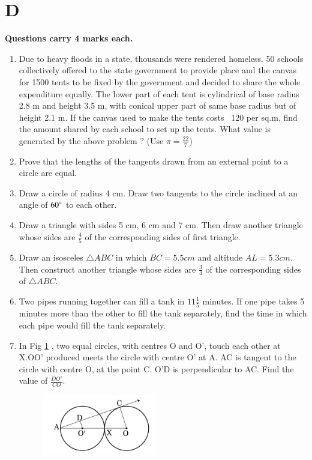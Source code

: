 \documentclass[book,11pt,onecolumn]{IEEEtran}
\renewcommand\thesection{\arabic{section}}
\begin{document}
\section{\textbf{D}}  
\textbf{Questions carry 4 marks each.} \\
\begin{enumerate}[label=\thesection.\arabic*.,ref=\thesection.\theenumi]
\item  Due to heavy floods in a state, thousands were rendered homeless. 50 schools collectively offered to the state government to provide place and the canvas for 1500 tents to be fixed by the government and decided to share the whole expenditure equally. The lower part of each tent is cylindrical of base radius 2.8 m and height 3.5 m, with conical upper part of same base radius but of height 2.1 m. If the canvas used to make the tents costs \rupee~120 per sq.m, find the amount shared by each school to set up the tents. What value is generated by the above problem ? (Use $ \pi = \frac{22}{7} ) $\\
 
\item Prove that the lengths of the tangents drawn from an external point to a circle are equal.\\
\item Draw a circle of radius 4 cm. Draw two tangents to the circle inclined at an angle of $ 60 \degree $ to each other.\\
\item Draw a triangle with sides 5 cm, 6 cm and 7 cm. Then draw another triangle whose sides are $\frac{4}{5}$ of the corresponding sides of first triangle.\\
\item Draw an isosceles $\triangle ABC$ in which $BC=5.5 cm$ and altitude $AL=5.3 cm$. Then construct another triangle whose sides are $\frac{3}{4}$ of the corresponding sides of $\triangle ABC$.\\
\item Two pipes running together can fill a tank in $11\frac{1}{5}$ minutes. If one pipe takes 5 minutes more than the other to fill the tank separately, find the time in which each pipe would fill the tank separately.\\
\item In Fig \ref{figure_7} , two equal circles, with centres O and O', touch each other at X.OO' produced meets the circle with centre O' at A. AC is tangent to the circle with centre O, at the point C. O'D is perpendicular to AC. Find the value of $\frac{DO'}{CO}$.\\
	\begin{figure}[H]
      \centering
      \includegraphics[width=5cm]{figs/7.png}
      \caption{}
      \label{figure_7}
   \end{figure} 
 

\end{enumerate}
\end{document}
